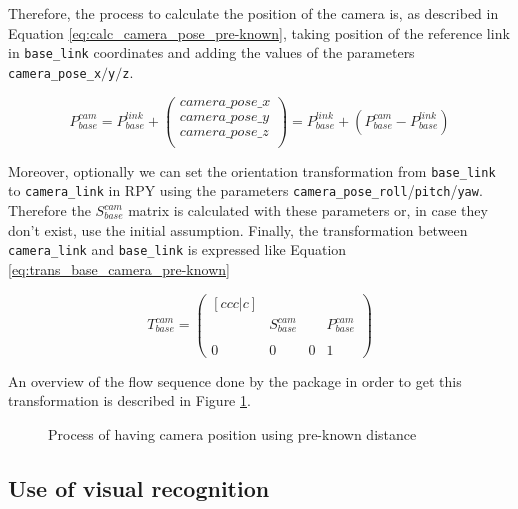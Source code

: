 \documentclass[12pt,a4paper,final,twoside,openright]{report}
\begin{document}
Therefore, the process to calculate the position of the camera is, as described in Equation \eqref{eq:calc_camera_pose_pre-known}, taking position of the reference link in \texttt{base\_link} coordinates and adding the values of the parameters \texttt{camera\_pose\_x}$/$\texttt{y}$/$\texttt{z}.

\begin{equation}\label{eq:calc_camera_pose_pre-known}
P_{base}^{cam} = P_{base}^{link} + \begin{pmatrix}
camera\_pose\_x \\
camera\_pose\_y \\
camera\_pose\_z \\
\end{pmatrix} = P_{base}^{link} + \left( P_{base}^{cam} - P_{base}^{link} \right)
\end{equation}

Moreover, optionally we can set the orientation transformation from \texttt{base\_link} to \texttt{camera\_link} in RPY using the parameters \texttt{camera\_pose\_roll}/\texttt{pitch}/\texttt{yaw}. Therefore the $S_{base}^{cam}$ matrix is calculated with these parameters or, in case they don't exist, use the initial assumption. Finally, the transformation between \texttt{camera\_link} and \texttt{base\_link} is expressed like Equation \eqref{eq:trans_base_camera_pre-known}

\begin{equation}\label{eq:trans_base_camera_pre-known}
T_{base}^{cam} = \begin{pmatrix}[ccc|c]
 &  &  & \\
 & S_{base}^{cam} & & P_{base}^{cam} \\
 &  &  & \\ \hline
0 & 0 & 0 & 1
\end{pmatrix}
\end{equation}

An overview of the flow sequence done by the package in order to get this transformation is described in Figure \ref{fig:flow_camera_preknown}.

\begin{figure}[h]
\centering

\caption{Process of having camera position using pre-known distance \label{fig:flow_camera_preknown}}
\end{figure}

\subsection{Use of visual recognition}
\label{sec:visual-recognition}
\end{document}
